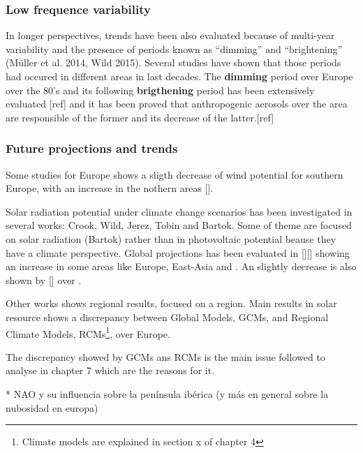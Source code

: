 \subsubsection{Low frequence variability}

In longer perspectives, trends have been also evaluated because of multi-year variability and the presence of periods known as “dimming” and “brightening” (Müller et al. 2014, Wild 2015). Several studies have shown that those periods had occured in different areas in last decades. The \textbf{dimming} period over Europe over the 80's and its following \textbf{brigthening} period has been extensively evaluated [ref] and it has been proved that anthropogenic aerosols over the area are responsible of the former and its decrease of the latter.[ref]
 


\subsubsection{Future projections and trends}
Some studies for Europe shows a sligth decrease of wind potential for southern Europe, with an increase in the nothern areas [].

Solar radiation potential under climate change scenarios has been investigated in several works: Crook, Wild, Jerez, Tobin and Bartok. Some of theme are focused on solar radiation (Bartok) rather than in photovoltaic potential beause they have a climate perspective. Global projections has been evaluated in [][] showing an increase in some areas like Europe, East-Asia and . An slightly decrease is also shown by [] over .

Other works shows regional results, focused on a region. Main results in solar resource shows a discrepancy between Global Models, GCMs, and Regional Climate Models, RCMs\footnote{Climate models are explained in section x of chapter 4}, over Europe.

The discrepancy showed by GCMs ans RCMs is the main issue followed to analyse in chapter 7 which are the reasons for it.

{\color{red} * NAO y su influencia sobre la península ibérica (y más en general sobre la nubosidad en europa)}
% 